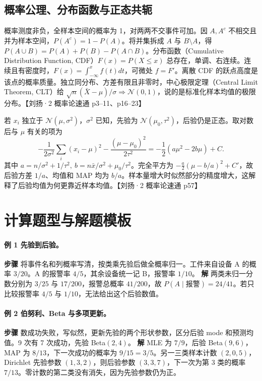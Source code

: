 \documentclass[UTF8,a4paper,zihao=-4,fontset=fandol]{ctexrep}
\begin{document}
\subsection*{概率公理、分布函数与正态共轭}
概率测度非负，全样本空间的概率为 1，对两两不交事件可加。因 $A,A^c$ 不相交且并为样本空间，$P(A^c)=1-P(A)$。将并集拆成 $A$ 与 $B\setminus A$，得 $P(A\cup B)=P(A)+P(B)-P(A\cap B)$。分布函数（Cumulative Distribution Function, CDF）$F(x)=P(X\le x)$ 总存在，单调、右连续。连续且有密度时，$F(x)=\int_{-\infty}^x f(t)dt$，可微处 $f=F'$。离散 CDF 的跃点高度是该点的概率质量。独立同分布、方差有限且非零时，中心极限定理（Central Limit Theorem, CLT）给 $\sqrt n(\bar X-\mu)/\sigma\Rightarrow\mathcal N(0,1)$，说的是标准化样本均值的极限分布。【刘扬·2 概率论速通 p3–11、p16–23】

若 $x_i$ 独立于 $\mathcal N(\mu,\sigma^2)$，$\sigma^2$ 已知，先验为 $\mathcal N(\mu_0,\tau^2)$，后验仍是正态。取对数后与 $\mu$ 有关的项为
\[
-\frac{1}{2\sigma^2}\sum_i(x_i-\mu)^2-\frac{(\mu-\mu_0)^2}{2\tau^2}
=-\frac12(a\mu^2-2b\mu)+C .
\]
其中 $a=n/\sigma^2+1/\tau^2,\ b=n\bar x/\sigma^2+\mu_0/\tau^2$。完全平方为 $-\tfrac a2(\mu-b/a)^2+C'$，故后验方差 $1/a$、均值和 MAP 均为 $b/a$。样本量增大时似然部分的精度增大，这解释了后验均值为何更靠近样本均值。【刘扬·2 概率论速通 p57】

\section{计算题型与解题模板}
\paragraph{例 1 先验到后验。}
\textbf{步骤} 将事件名和列概率写清，按类乘先验后做全概率归一。工件来自设备 A 的概率 \(3/20\)。A 的报警率 \(4/5\)，其余设备统一记 B，报警率 \(1/10\)。
\textbf{解} 两类未归一分数分别为 \(3/25\) 与 \(17/200\)，报警总概率 \(41/200\)，故 \(P(A\mid\text{报警})=24/41\)。若只比较报警率 \(4/5\) 与 \(1/10\)，无法给出这个后验数值。

\paragraph{例 2 伯努利、Beta 与多项更新。}
\textbf{步骤} 数成功失败，写似然，更新先验的两个形状参数，区分后验 mode 和预测均值。9 次有 7 次成功，先验 Beta\((2,4)\)。
\textbf{解} MLE 为 \(7/9\)，后验 Beta\((9,6)\)，MAP 为 \(8/13\)，下一次成功的概率为 \(9/15=3/5\)。另一三类样本计数 \((2,0,5)\)，Dirichlet 先验参数 \((1,3,2)\)，则后验参数 \((3,3,7)\)，下一次为第 3 类的概率 \(7/13\)。零计数的第二类没有消失，因为先验参数仍为正。
\end{document}
